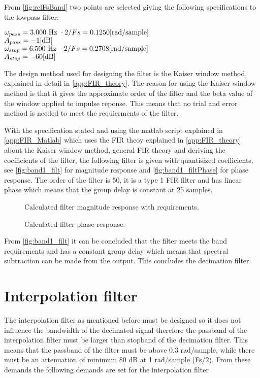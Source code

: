 From \autoref{fig:relFsBand} two points are selected giving the following specifications to the lowpass filter:

$\omega_{pass}=3.000\textrm{ Hz }\cdot 2/Fs=0.1250 \enhed{rad/sample}$\\
$A_{pass}=-1 \enhed{dB}$\\
$\omega_{stop}=6.500\textrm{ Hz }\cdot 2/Fs=0.2708 \enhed{rad/sample}$\\
$A_{stop}=-60 \enhed{dB}$

The design method used for designing the filter is the Kaiser window method, explained in detail in \autoref{app:FIR_theory}. The reason for using the Kaiser window method is that it gives the approximate order of the filter and the beta value of the window applied to impulse reponse. This means that no trial and error method is needed to meet the requierments of the filter.

With the specification stated and using the matlab script explained in \autoref{app:FIR_Matlab} which uses the FIR theoy explained in \autoref{app:FIR_theory} about the Kaiser window method, general FIR theory and deriving the coefficients of the filter, the following filter is given with quantisized coefficients, see \autoref{fig:band1_filt} for magnitude response and \autoref{fig:band1_filtPhase} for phase response. The order of the filter is 50, it is a type 1 FIR filter and has linear phase which means that the group delay is constant at 25 samples.  

\begin{figure}[H]
\centering
	
	\caption{Calculated filter magnitude response with requirements.}
	\label{fig:band1_filt}
\end{figure}
\begin{figure}[H]
\centering
	
	\caption{Calculated filter phase response.}
	\label{fig:band1_filtPhase}
\end{figure}

From \autoref{fig:band1_filt} it can be concluded that the filter meets the band requirements and has a constant group delay which means that spectral subtraction can be made from the output. This concludes the decimation filter. 

\section{Interpolation filter} \label{sec:IntFilter}
The interpolation filter as mentioned before must be designed so it does not influence the bandwidth of the decimated signal therefore the passband of the interpolation filter must be larger than stopband of the decimation filter. This means that the passband of the filter must be above 0.3 rad/sample, while there must be an attenuation of minimum 80 dB at 1 rad/sample (Fs/2). From these demands the following demands are set for the interpolation filter

